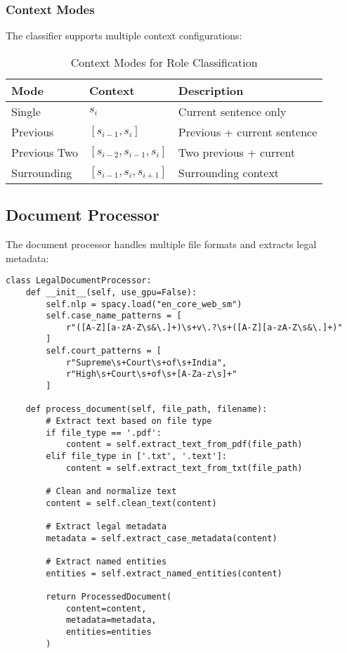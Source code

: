 \documentclass[12pt,a4paper]{article}
\begin{document}
\subsubsection{Context Modes}

The classifier supports multiple context configurations:

\begin{table}[H]
\centering
\begin{tabular}{|l|l|p{6cm}|}
\hline
\textbf{Mode} & \textbf{Context} & \textbf{Description} \\
\hline
Single & $s_i$ & Current sentence only \\
Previous & $[s_{i-1}, s_i]$ & Previous + current sentence \\
Previous Two & $[s_{i-2}, s_{i-1}, s_i]$ & Two previous + current \\
Surrounding & $[s_{i-1}, s_i, s_{i+1}]$ & Surrounding context \\
\hline
\end{tabular}
\caption{Context Modes for Role Classification}
\end{table}

\subsection{Document Processor}

The document processor handles multiple file formats and extracts legal metadata:

\begin{lstlisting}[caption={Document Processing Pipeline}]
class LegalDocumentProcessor:
    def __init__(self, use_gpu=False):
        self.nlp = spacy.load("en_core_web_sm")
        self.case_name_patterns = [
            r"([A-Z][a-zA-Z\s&\.]+)\s+v\.?\s+([A-Z][a-zA-Z\s&\.]+)"
        ]
        self.court_patterns = [
            r"Supreme\s+Court\s+of\s+India",
            r"High\s+Court\s+of\s+[A-Za-z\s]+"
        ]
    
    def process_document(self, file_path, filename):
        # Extract text based on file type
        if file_type == '.pdf':
            content = self.extract_text_from_pdf(file_path)
        elif file_type in ['.txt', '.text']:
            content = self.extract_text_from_txt(file_path)
        
        # Clean and normalize text
        content = self.clean_text(content)
        
        # Extract legal metadata
        metadata = self.extract_case_metadata(content)
        
        # Extract named entities
        entities = self.extract_named_entities(content)
        
        return ProcessedDocument(
            content=content,
            metadata=metadata,
            entities=entities
        )
\end{lstlisting}
\end{document}
